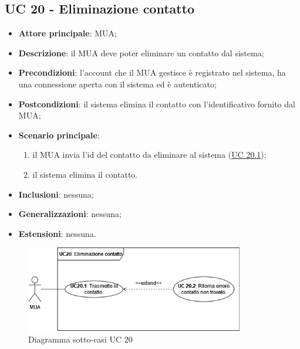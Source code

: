 \subsection{UC 20 - Eliminazione contatto} \label{sec:UC20}
    \begin{itemize}
        \item \textbf{Attore principale}: MUA;
        \item \textbf{Descrizione}: il MUA deve poter eliminare un contatto dal sistema;
        \item \textbf{Precondizioni}: l’account che il MUA gestisce è registrato nel sistema, ha una connessione aperta con il sistema ed è autenticato;
        \item \textbf{Postcondizioni}: il sistema elimina il contatto con l'identificativo fornito dal MUA;
        \item \textbf{Scenario principale}:
            \begin{enumerate}
                \item il MUA invia l'id del contatto da eliminare al sistema (\hyperref[sec:UC20.1]{UC 20.1});
                \item il sistema elimina il contatto.
            \end{enumerate}
        \item \textbf{Inclusioni}: nessuna;
        \item \textbf{Generalizzazioni}: nessuna;
        \item \textbf{Estensioni}: nessuna.
    \end{itemize}

\begin{figure}[h]
    \includegraphics[width=0.85\textwidth]{sections/uc_imgs/UC20.png}
    \centering
    \caption{Diagramma sotto-casi UC 20}
\end{figure}

